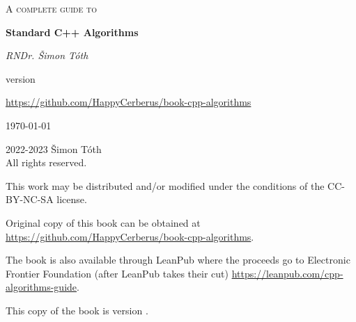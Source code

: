 \begin{titlepage}
	\centering
	\vspace{2cm}
	{\scshape\huge A complete guide to\par}
	\vspace{1.5cm}
	{\huge\bfseries Standard C++ Algorithms\par}
	\vspace{2cm}
	{\Large\itshape RNDr. Šimon Tóth\par}
	\vfill
	version \version\par
	\href{https://github.com/HappyCerberus/book-cpp-algorithms}{https://github.com/HappyCerberus/book-cpp-algorithms}

	\vfill

	{\large \today\par}
\end{titlepage}

\pagestyle{empty}
\begingroup
\footnotesize
\parindent 0pt
\parskip \baselineskip
\vfill
\textcopyright{} 2022-2023 Šimon Tóth \\
All rights reserved.

This work may be distributed and/or modified under the conditions of the CC-BY-NC-SA license.

Original copy of this book can be obtained at \href{https://github.com/HappyCerberus/book-cpp-algorithms}{https://github.com/HappyCerberus/book-cpp-algorithms}.

The book is also available through LeanPub where the proceeds go to Electronic Frontier Foundation (after LeanPub takes their cut) \href{https://leanpub.com/cpp-algorithms-guide}{https://leanpub.com/cpp-algorithms-guide}.

This copy of the book is version \version.

\vfill

\vspace*{2\baselineskip}


\endgroup
\clearpage
\pagestyle{plain}
\restoregeometry